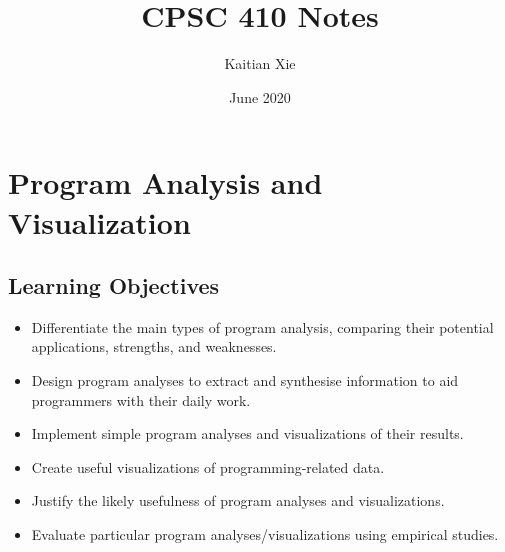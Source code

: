 \documentclass{article}
\title{CPSC 410 Notes}
\author{Kaitian Xie}
\date{June 2020}
\begin{document}
\maketitle
\pagebreak

\tableofcontents
\pagebreak

\section{Program Analysis and Visualization}

\subsection{Learning Objectives}

\begin{itemize}
    \item Differentiate the main types of program analysis, comparing their potential applications, strengths, and weaknesses.
    \item Design program analyses to extract and synthesise information to aid programmers with their daily work.
    \item Implement simple program analyses and visualizations of their results.
    \item Create useful visualizations of programming-related data.
    \item Justify the likely usefulness of program analyses and visualizations.
    \item Evaluate particular program analyses/visualizations using empirical studies.
\end{itemize}
\end{document}
